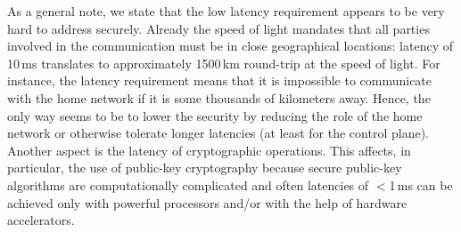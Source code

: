 \documentclass[12pt]{llncs}
\begin{document}
As a general note, we state that the low latency requirement appears to be very hard to address securely. Already the speed of light mandates that all parties involved in the communication must be in close geographical locations: latency of 10\,ms translates to approximately 1500\,km round-trip at the speed of light. For instance, the latency requirement means that it is impossible to communicate with the home network if it is some thousands of kilometers away. Hence, the only way seems to be to lower the security by reducing the role of the home network or otherwise tolerate longer latencies (at least for the control plane). Another aspect is the latency of cryptographic operations. This affects, in particular, the use of public-key cryptography because secure public-key algorithms are computationally complicated and often latencies of $<$1\,ms can be achieved only with powerful processors and/or with the help of hardware accelerators. 
\end{document}
